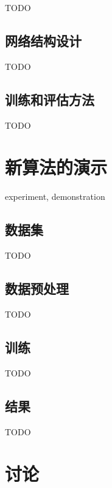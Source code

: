 TODO

\subsection{网络结构设计}

TODO

\subsection{训练和评估方法}

TODO


\section{新算法的演示}

experiment, demonstration

\subsection{数据集}

TODO

\subsection{数据预处理}

TODO

\subsection{训练}

TODO

\subsection{结果}

TODO


\section{讨论}

